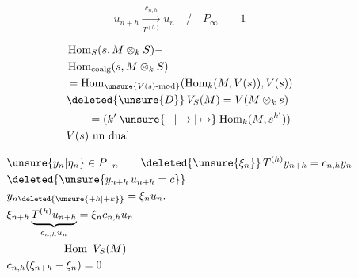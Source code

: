 \[
u_{n+h}\xrightarrow[T^{(h)}]{c_{n,h}}u_n\quad/\quad{P_\infty}
\qquad 1
\]

\[
\begin{aligned}
&\operatorname{Hom}_S(s,M\otimes_k S)\mathord{-}\\
&\operatorname{Hom}_{\mathrm{coalg}}(s,M\otimes_k S)\\
&=\operatorname{Hom}_{\unsure{V(s)\text{-mod}}}(\operatorname{Hom}_k(M,V(s)),V(s))\\
&\deleted{\unsure{D}}\,V_S(M)=V(M\otimes_k s)\\
&\qquad=(k'\mathbin{\unsure{-|\to|\mapsto}}\operatorname{Hom}_k(M,s^{k'}))\\
& V(s)\text{ un dual}
\end{aligned}
\]

\[
\begin{aligned}
&\unsure{y_n|\eta_n}\in P_{-n}\qquad \deleted{\unsure{\xi_n}}\,T^{(h)}y_{n+h}=c_{n,h}y_n\\
&\deleted{\unsure{y_{n+h}\,u_{n+h}=c}}\\
&y_{n\deleted{\unsure{+h|+k}}}=\xi_n u_n.\\
&\xi_{n+h}\underbrace{T^{(h)}u_{n+h}}_{c_{n,h}u_n}=\xi_n c_{n,h}u_n\\
&\hspace{5em}\operatorname{Hom}\ V_S(M)\\
&c_{n,h}(\xi_{n+h}-\xi_n)=0
\end{aligned}
\]

